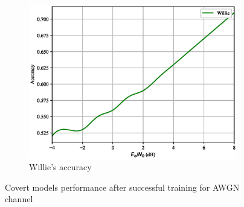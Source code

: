 \begin{figure}[th!]
\begin{subfigure}{0.3\textwidth}
		\includegraphics[width=\linewidth]{figs/willie_accuracy_awgn}
		\caption{Willie's accuracy}	
	\end{subfigure}
	\caption{Covert models performance after successful training for AWGN channel}%
\end{figure}
